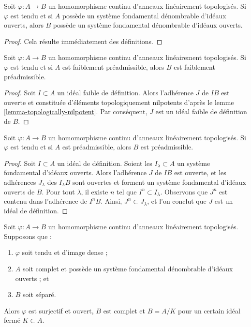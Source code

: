 \begin{lemma}
\label{lemma-taut-ascent-countable}
Soit $\varphi : A \to B$ un homomorphisme continu d'anneaux
linéairement topologisés. Si $\varphi$ est tendu et si $A$
possède un système fondamental dénombrable d'idéaux ouverts, alors
$B$ possède un système fondamental dénombrable d'idéaux ouverts.
\end{lemma}

\begin{proof}
Cela résulte immédiatement des définitions.
\end{proof}

\begin{lemma}
\label{lemma-taut-ascent-weakly-admissible}
Soit $\varphi : A \to B$ un homomorphisme continu d'anneaux
linéairement topologisés. Si $\varphi$ est tendu et si $A$
est faiblement préadmissible, alors $B$ est faiblement préadmissible.
\end{lemma}

\begin{proof}
Soit $I \subset A$ un idéal faible de définition. Alors l'adhérence
$J$ de $IB$ est ouverte et constituée d'éléments topologiquement nilpotents
d'après le lemme \ref{lemma-topologically-nilpotent}. Par conséquent, $J$ est un idéal faible
de définition de $B$.
\end{proof}

\begin{lemma}
\label{lemma-taut-ascent-admissible}
Soit $\varphi : A \to B$ un homomorphisme continu d'anneaux
linéairement topologisés. Si $\varphi$ est tendu et si $A$
est préadmissible, alors $B$ est préadmissible.
\end{lemma}

\begin{proof}
Soit $I \subset A$ un idéal de définition. Soient
les $I_\lambda \subset A$ un système fondamental d'idéaux ouverts.
Alors l'adhérence $J$ de $IB$ est ouverte, et les
adhérences $J_\lambda$ des $I_\lambda B$ sont ouvertes et forment un
système fondamental d'idéaux ouverts de $B$.
Pour tout $\lambda$, il existe $n$ tel que $I^n \subset I_\lambda$.
Observons que $J^n$ est contenu dans l'adhérence de $I^nB$.
Ainsi, $J^n \subset J_\lambda$, et l'on conclut que $J$ est un
idéal de définition.
\end{proof}

\begin{lemma}
\label{lemma-dense-image-surjective}
Soit $\varphi : A \to B$ un homomorphisme continu d'anneaux
linéairement topologisés. Supposons que :
\begin{enumerate}
\item $\varphi$ soit tendu et d'image dense ;
\item $A$ soit complet et possède un système fondamental dénombrable
d'idéaux ouverts ; et
\item $B$ soit séparé.
\end{enumerate}
Alors $\varphi$ est surjectif et ouvert, $B$ est complet et $B = A/K$ pour
un certain idéal fermé $K \subset A$.
\end{lemma}

